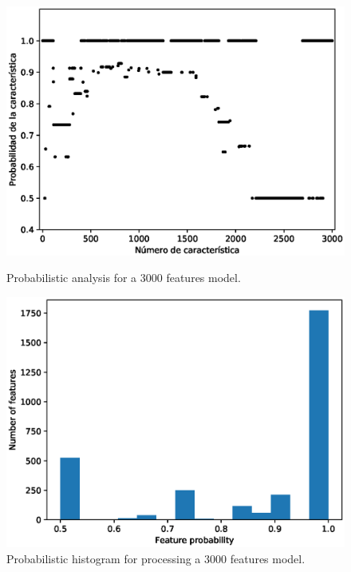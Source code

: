 \begin{figure}[h]
        \centering
        \begin{minipage}[b]{0.48\textwidth}
                \includegraphics[width=\textwidth]{plot_probs_FeatureModel3000.eps}
\caption{Probabilistic analysis for a 3000 features model.}\label{fig:plot:probs:probs}
        \end{minipage}
        \hfill
        \begin{minipage}[b]{0.48\textwidth}
                \includegraphics[width=\textwidth]{plot_probs_histogram_FeatureModel3000.eps}
        \caption{Probabilistic histogram for processing a 3000 features model.}\label{fig:plot:probs:probs:sorted}
        \end{minipage}
\end{figure}


